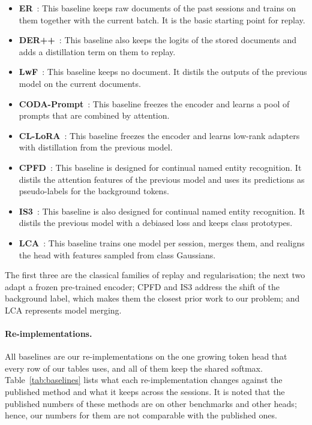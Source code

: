 \begin{itemize}
  \item \textbf{ER}~\citep{rolnick2019er}: This baseline keeps raw documents of the past
        sessions and trains on them together with the current batch. It is the basic
        starting point for replay.
  \item \textbf{DER++}~\citep{buzzega2020der}: This baseline also keeps the logits of the
        stored documents and adds a distillation term on them to replay.
  \item \textbf{LwF}~\citep{li2017lwf}: This baseline keeps no document. It distils the
        outputs of the previous model on the current documents.
  \item \textbf{CODA-Prompt}~\citep{smith2023coda}: This baseline freezes the encoder and
        learns a pool of prompts that are combined by attention.
  \item \textbf{CL-LoRA}~\citep{he2025cllora}: This baseline freezes the encoder and learns
        low-rank adapters with distillation from the previous model.
  \item \textbf{CPFD}~\citep{zhang2023cpfd}: This baseline is designed for continual named
        entity recognition. It distils the attention features of the previous model and
        uses its predictions as pseudo-labels for the background tokens.
  \item \textbf{IS3}~\citep{qiu2024is3}: This baseline is also designed for continual named
        entity recognition. It distils the previous model with a debiased loss and keeps
        class prototypes.
  \item \textbf{LCA}~\citep{lca2026}: This baseline trains one model per session, merges
        them, and realigns the head with features sampled from class Gaussians.
\end{itemize}

\noindent The first three are the classical families of replay and regularisation; the
next two adapt a frozen pre-trained encoder; CPFD and IS3 address the shift of the
background label, which makes them the closest prior work to our problem; and LCA
represents model merging.

\paragraph{Re-implementations.} All baselines are our re-implementations on the one
growing token head that every row of our tables uses, and all of them keep the shared
softmax. Table~\ref{tab:baselines} lists what each re-implementation changes against the
published method and what it keeps across the sessions. It is noted that the published
numbers of these methods are on other benchmarks and other heads; hence, our numbers for
them are not comparable with the published ones.

